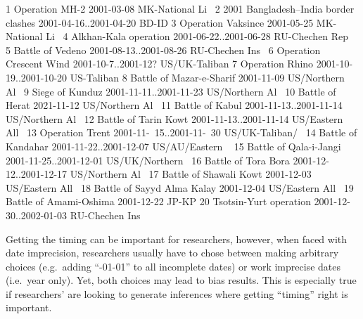 \documentclass[
]{jss}
\begin{document}
\begin{CodeChunk}
\begin{CodeOutput}
 1 Operation MH-2                       2001-03-08               MK-National Li~
 2 2001 Bangladesh–India border clashes 2001-04-16..2001-04-20   BD-ID          
 3 Operation Vaksince                   2001-05-25               MK-National Li~
 4 Alkhan-Kala operation                2001-06-22..2001-06-28   RU-Chechen Rep~
 5 Battle of Vedeno                     2001-08-13..2001-08-26   RU-Chechen Ins~
 6 Operation Crescent Wind              2001-10-7..2001-12?      US/UK-Taliban  
 7 Operation Rhino                      2001-10-19..2001-10-20   US-Taliban     
 8 Battle of Mazar-e-Sharif             2001-11-09               US/Northern Al~
 9 Siege of Kunduz                      2001-11-11..2001-11-23   US/Northern Al~
10 Battle of Herat                      2021-11-12               US/Northern Al~
11 Battle of Kabul                      2001-11-13..2001-11-14   US/Northern Al~
12 Battle of Tarin Kowt                 2001-11-13..2001-11-14   US/Eastern All~
13 Operation Trent                      2001-11-~15..2001-11-~30 US/UK-Taliban/~
14 Battle of Kandahar                   2001-11-22..2001-12-07   US/AU/Eastern ~
15 Battle of Qala-i-Jangi               2001-11-25..2001-12-01   US/UK/Northern~
16 Battle of Tora Bora                  2001-12-12..2001-12-17   US/Northern Al~
17 Battle of Shawali Kowt               2001-12-03               US/Eastern All~
18 Battle of Sayyd Alma Kalay           2001-12-04               US/Eastern All~
19 Battle of Amami-Oshima               2001-12-22               JP-KP          
20 Tsotsin-Yurt operation               2001-12-30..2002-01-03   RU-Chechen Ins~
\end{CodeOutput}
\end{CodeChunk}

Getting the timing can be important for researchers, however, when faced
with date imprecision, researchers usually have to chose between making
arbitrary choices (e.g.~adding ``-01-01'' to all incomplete dates) or
work imprecise dates (i.e.~year only). Yet, both choices may lead to
bias results. This is especially true if researchers' are looking to
generate inferences where getting ``timing'' right is important.
\end{document}
